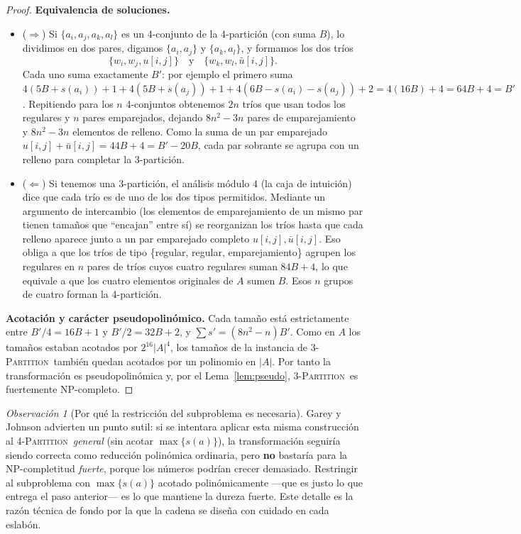 \documentclass[12pt,a4paper]{article}
\theoremstyle{definition}
\theoremstyle{remark}
\newtheorem{remark}{Observación}
\newcommand{\TPART}{\textsc{3-Partition}}
\newcommand{\FPART}{\textsc{4-Partition}}
\begin{document}
\begin{proof}
\medskip
\noindent\textbf{Equivalencia de soluciones.}
\begin{itemize}
  \item ($\Rightarrow$) Si $\{a_i, a_j, a_k, a_l\}$ es un 4-conjunto de la
        4-partición (con suma $B$), lo dividimos en dos pares, digamos
        $\{a_i, a_j\}$ y $\{a_k, a_l\}$, y formamos los dos tríos
        \[
          \{w_i, w_j, u[i,j]\}
          \quad\text{y}\quad
          \{w_k, w_l, \bar u[i,j]\}.
        \]
        Cada uno suma exactamente $B'$: por ejemplo el primero suma
        $4(5B+s(a_i)) + 1 + 4(5B+s(a_j)) + 1 + 4(6B - s(a_i) - s(a_j)) + 2
        = 4(16B) + 4 = 64B + 4 = B'$.
        Repitiendo para los $n$ 4-conjuntos obtenemos $2n$ tríos que usan todos los
        regulares y $n$ pares emparejados, dejando $8n^2 - 3n$ pares de
        emparejamiento y $8n^2 - 3n$ elementos de relleno. Como la suma de un par emparejado
        $u[i,j] + \bar u[i,j] = 44B + 4 = B' - 20B$, cada par sobrante se agrupa con
        un relleno para completar la 3-partición.
  \item ($\Leftarrow$) Si tenemos una 3-partición, el análisis módulo 4 (la caja de
        intuición) dice que cada trío es de uno de los dos tipos permitidos.
        Mediante un argumento de intercambio (los elementos de emparejamiento de un
        mismo par tienen tamaños que ``encajan'' entre sí) se reorganizan los tríos
        hasta que cada relleno aparece junto a un par emparejado completo
        $u[i,j], \bar u[i,j]$. Eso obliga a que los tríos de tipo
        \{regular, regular, emparejamiento\} agrupen los regulares en $n$ pares de
        tríos cuyos cuatro regulares suman $84B + 4$, lo que equivale a que los
        cuatro elementos originales de $A$ sumen $B$. Esos $n$ grupos de cuatro
        forman la 4-partición.
\end{itemize}

\medskip
\noindent\textbf{Acotación y carácter pseudopolinómico.}
Cada tamaño está estrictamente entre $B'/4 = 16B+1$ y $B'/2 = 32B+2$, y
$\sum s' = (8n^2 - n) B'$. Como en $A$ los tamaños estaban acotados por
$2^{16}|A|^4$, los tamaños de la instancia de \TPART\ también quedan acotados por
un polinomio en $|A|$. Por tanto la transformación es pseudopolinómica y, por el
Lema~\ref{lem:pseudo}, \TPART\ es fuertemente NP-completo.
\end{proof}

\begin{remark}[Por qué la restricción del subproblema es necesaria]
Garey y Johnson advierten un punto sutil: si se intentara aplicar esta misma
construcción al \FPART\ \emph{general} (sin acotar $\max\{s(a)\}$), la
transformación seguiría siendo correcta como reducción polinómica ordinaria, pero
\textbf{no} bastaría para la NP-completitud \emph{fuerte}, porque los números
podrían crecer demasiado. Restringir al subproblema con $\max\{s(a)\}$ acotado
polinómicamente —que es justo lo que entrega el paso anterior— es lo que mantiene
la dureza fuerte. Este detalle es la razón técnica de fondo por la que la cadena se
diseña con cuidado en cada eslabón.
\end{remark}
\end{document}
